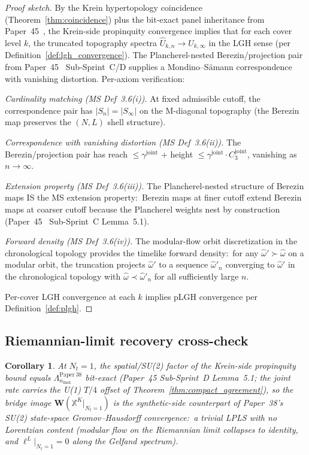 \documentclass[11pt,a4paper]{article}
\theoremstyle{plain}
\newtheorem{corollary}[theorem]{Corollary}
\theoremstyle{definition}
\newcommand{\nmax}{n_{\max}}
\newcommand{\Nt}{N_{t}}
\newcommand{\gammajoint}{\gamma^{\mathrm{joint}}}
\newcommand{\Wfun}{\mathbf{W}}
\begin{document}
\begin{proof}[Proof sketch]
By the Krein hypertopology coincidence (Theorem~\ref{thm:coincidence})
plus the bit-exact panel inheritance from Paper~45~\cite{paper45},
the Krein-side propinquity convergence implies that for each cover
level $k$, the truncated topography spectra $\hat{U}_{k, n} \to
\hat{U}_{k, \infty}$ in the LGH sense (per
Definition~\ref{def:lgh_convergence}). The Plancherel-nested
Berezin/projection pair from Paper~45~\cite{paper45} Sub-Sprint~C/D
supplies a Mondino--S\"amann correspondence with vanishing
distortion. Per-axiom verification:

\emph{Cardinality matching (MS Def~3.6(i)).} At fixed admissible
cutoff, the correspondence pair has $|S_{n}| = |S_{\infty}|$ on the
M-diagonal topography (the Berezin map preserves the $(N, L)$ shell
structure).

\emph{Correspondence with vanishing distortion (MS Def~3.6(ii)).}
The Berezin/projection pair has reach $\le \gammajoint$ + height $\le
\gammajoint \cdot C_{3}^{\mathrm{joint}}$, vanishing as $n \to \infty$.

\emph{Extension property (MS Def~3.6(iii)).} The Plancherel-nested
structure of Berezin maps IS the MS extension property:\ Berezin maps
at finer cutoff extend Berezin maps at coarser cutoff because the
Plancherel weights nest by construction (Paper~45~\cite{paper45}
Sub-Sprint~C Lemma~5.1).

\emph{Forward density (MS Def~3.6(iv)).} The modular-flow orbit
discretization in the chronological topology provides the timelike
forward density:\ for any $\hat{\omega}' \succ \hat{\omega}$ on a
modular orbit, the truncation projects $\hat{\omega}'$ to a sequence
$\hat{\omega}'_{n}$ converging to $\hat{\omega}'$ in the chronological
topology with $\hat{\omega} \prec \hat{\omega}'_{n}$ for all
sufficiently large $n$.

Per-cover LGH convergence at each $k$ implies pLGH convergence per
Definition~\ref{def:plgh}.
\end{proof}

\subsection{Riemannian-limit recovery cross-check}\label{sec:riemannian_limit_cross}

\begin{corollary}\label{cor:riemannian_limit_cross}
At $\Nt = 1$, the spatial/SU(2) factor of the Krein-side propinquity
bound equals $\Lambda^{\mathrm{Paper~38}}_{\nmax}$ bit-exact (Paper~45
Sub-Sprint~D Lemma~5.1; the joint rate carries the U(1) $T/4$ offset of
Theorem~\ref{thm:compact_agreement}), so the bridge image
$\Wfun(\mathbb{X}^{K}|_{\Nt = 1})$ is
the synthetic-side counterpart of Paper~38's SU(2) state-space
Gromov--Hausdorff convergence:\ a trivial LPLS with no Lorentzian content (modular flow
on the Riemannian limit collapses to identity, and $\ell^{L}|_{\Nt=1}
= 0$ along the Gelfand spectrum).
\end{corollary}
\end{document}
